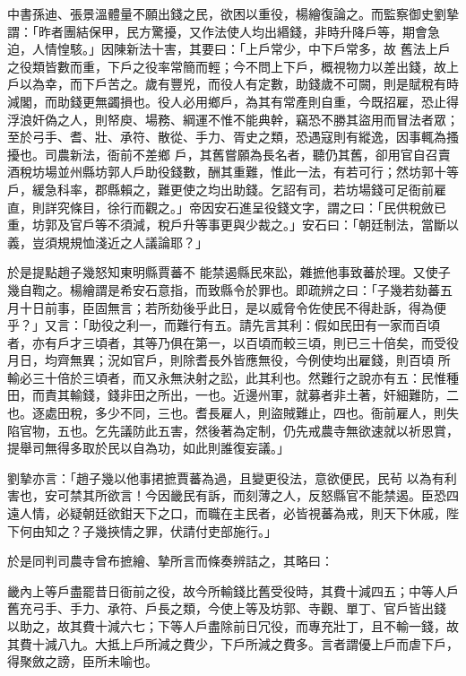 \begin{pinyinscope}
 中書孫迪、張景溫體量不願出錢之民，欲困以重役，楊繪復論之。而監察御史劉摯謂：「昨者團結保甲，民方驚擾，又作法使人均出緡錢，非時升降戶等，期會急迫，人情惶駭。」因陳新法十害，其要曰：「上戶常少，中下戶常多，故
 舊法上戶之役類皆數而重，下戶之役率常簡而輕；今不問上下戶，概視物力以差出錢，故上戶以為幸，而下戶苦之。歲有豐兇，而役人有定數，助錢歲不可闕，則是賦稅有時減閣，而助錢更無蠲損也。役人必用鄉戶，為其有常產則自重，今既招雇，恐止得浮浪奸偽之人，則帑庾、場務、綱運不惟不能典幹，竊恐不勝其盜用而冒法者眾；至於弓手、耆、壯、承符、散從、手力、胥史之類，恐遇寇則有縱逸，因事輒為搔擾也。司農新法，衙前不差鄉
 戶，其舊嘗願為長名者，聽仍其舊，卻用官自召賣酒稅坊場並州縣坊郭人戶助役錢數，酬其重難，惟此一法，有若可行；然坊郭十等戶，緩急科率，郡縣賴之，難更使之均出助錢。乞詔有司，若坊場錢可足衙前雇直，則詳究條目，徐行而觀之。」帝因安石進呈役錢文字，謂之曰：「民供稅斂已重，坊郭及官戶等不須減，稅戶升等事更與少裁之。」安石曰：「朝廷制法，當斷以義，豈須規規恤淺近之人議論耶？」



 於是提點趙子幾怒知東明縣賈蕃不
 能禁遏縣民來訟，雜摭他事致蕃於理。又使子幾自鞫之。楊繪謂是希安石意指，而致縣令於罪也。即疏辨之曰：「子幾若劾蕃五月十日前事，臣固無言；若所劾後乎此日，是以威脅令佐使民不得赴訴，得為便乎？」又言：「助役之利一，而難行有五。請先言其利：假如民田有一家而百頃者，亦有戶才三頃者，其等乃俱在第一，以百頃而較三頃，則已三十倍矣，而受役月日，均齊無異；況如官戶，則除耆長外皆應無役，今例使均出雇錢，則百頃
 所輸必三十倍於三頃者，而又永無決射之訟，此其利也。然難行之說亦有五：民惟種田，而責其輸錢，錢非田之所出，一也。近邊州軍，就募者非土著，奸細難防，二也。逐處田稅，多少不同，三也。耆長雇人，則盜賊難止，四也。衙前雇人，則失陷官物，五也。乞先議防此五害，然後著為定制，仍先戒農寺無欲速就以祈恩賞，提舉司無得多取於民以自為功，如此則誰復妄議。」



 劉摯亦言：「趙子幾以他事捃摭賈蕃為過，且變更役法，意欲便民，民茍
 以為有利害也，安可禁其所欲言！今因畿民有訴，而刻薄之人，反怒縣官不能禁遏。臣恐四遠人情，必疑朝廷欲鉗天下之口，而職在主民者，必皆視蕃為戒，則天下休戚，陛下何由知之？子幾挾情之罪，伏請付吏部施行。」



 於是同判司農寺曾布摭繪、摯所言而條奏辨詰之，其略曰：



 畿內上等戶盡罷昔日衙前之役，故今所輸錢比舊受役時，其費十減四五；中等人戶舊充弓手、手力、承符、戶長之類，今使上等及坊郭、寺觀、單丁、官戶皆出錢
 以助之，故其費十減六七；下等人戶盡除前日冗役，而專充壯丁，且不輸一錢，故其費十減八九。大抵上戶所減之費少，下戶所減之費多。言者謂優上戶而虐下戶，得聚斂之謗，臣所未喻也。




\end{pinyinscope}
